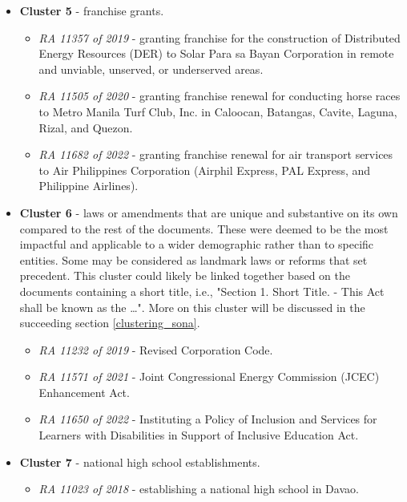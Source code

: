 \documentclass[conference]{IEEEtran}
\begin{document}
\begin{itemize}
\begin{itemize}
        \item \textit{RA 11348 of 2019} - establishing a Polytechnic University of the Philippines (PUP) campus in San Juan, Metro Manila.
    \end{itemize}
    \item \textbf{Cluster 5} - franchise grants.
    \begin{itemize}
        \item \textit{RA 11357 of 2019} - granting franchise for the construction of Distributed Energy Resources (DER) to Solar Para sa Bayan Corporation in remote and unviable, unserved, or underserved areas.
        \item \textit{RA 11505 of 2020} - granting franchise renewal for conducting horse races to Metro Manila Turf Club, Inc. in Caloocan, Batangas, Cavite, Laguna, Rizal, and Quezon.
        \item \textit{RA 11682 of 2022} - granting franchise renewal for air transport services to Air Philippines Corporation (Airphil Express, PAL Express, and Philippine Airlines).
    \end{itemize}
    \item \textbf{Cluster 6} - laws or amendments that are unique and substantive on its own compared to the rest of the documents. These were deemed to be the most impactful and applicable to a wider demographic rather than to specific entities. Some may be considered as landmark laws or reforms that set precedent. This cluster could likely be linked together based on the documents containing a short title, i.e., "Section 1. Short Title. - This Act shall be known as the \dots". More on this cluster will be discussed in the succeeding section \ref{clustering_sona}.
    \begin{itemize}
        \item \textit{RA 11232 of 2019} - Revised Corporation Code.
        \item \textit{RA 11571 of 2021} - Joint Congressional Energy Commission (JCEC) Enhancement Act.
        \item \textit{RA 11650 of 2022} - Instituting a Policy of Inclusion and Services for Learners with Disabilities in Support of Inclusive Education Act.
    \end{itemize}
    \item \textbf{Cluster 7} - national high school establishments.
    \begin{itemize}
        \item \textit{RA 11023 of 2018} - establishing a national high school in Davao.

\end{itemize}
\end{itemize}
\end{document}
